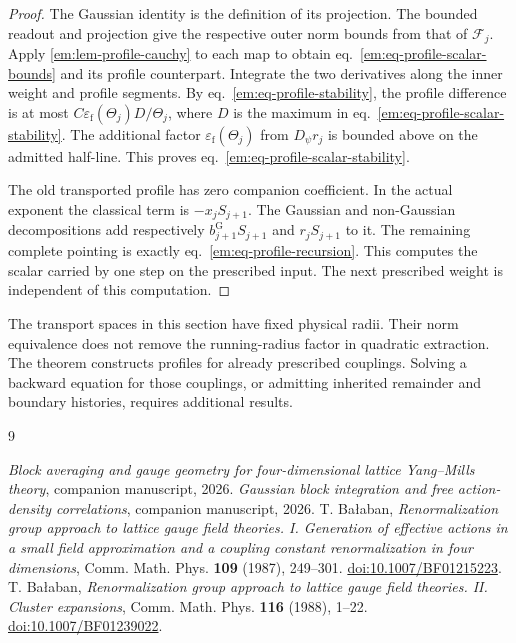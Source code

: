 \documentclass[11pt,letterpaper,reqno]{amsart}
\numberwithin{equation}{section}
\renewcommand{\eqref}[1]{\textup{eq.~\ref{#1}}}
\theoremstyle{definition}
\theoremstyle{remark}
\begin{document}
\begin{proof}
The Gaussian identity is the definition of its projection. The
bounded readout and projection give the respective outer norm
bounds from that of $\mathcal F_j$. Apply
\cref{em:lem-profile-cauchy} to each map to obtain
\eqref{em:eq-profile-scalar-bounds} and its profile counterpart.
Integrate the two derivatives along the inner weight and profile
segments. By \eqref{em:eq-profile-stability}, the profile difference
is at most $C\varepsilon_{\mathrm f}(\Theta_j)D/\Theta_j$, where $D$
is the maximum in \eqref{em:eq-profile-scalar-stability}. The
additional factor $\varepsilon_{\mathrm f}(\Theta_j)$ from $D_\psi r_j$
is bounded above on the admitted half-line. This proves
\eqref{em:eq-profile-scalar-stability}.

The old transported profile has zero companion coefficient. In
the actual exponent the classical term is $-x_j S_{j+1}$.
The Gaussian and non-Gaussian decompositions add respectively
$b^{\mathrm G}_{j+1} S_{j+1}$ and $r_j S_{j+1}$ to it. The remaining complete
pointing is exactly \eqref{em:eq-profile-recursion}. This computes
the scalar carried by one step on the prescribed input. The next
prescribed weight is independent of this computation.
\end{proof}

The transport spaces in this section have fixed physical radii.
Their norm equivalence does not remove the running-radius factor
in quadratic extraction. The theorem constructs profiles for
already prescribed couplings. Solving a backward equation for
those couplings, or admitting inherited remainder and boundary
histories, requires additional results.

\begin{thebibliography}{9}
\raggedright
{} \emph{Block averaging and gauge geometry for four-dimensional lattice Yang--Mills theory}, companion manuscript, 2026.
 \emph{Gaussian block integration and free action-density correlations}, companion manuscript, 2026.
 T. Ba\l aban, \emph{Renormalization group approach to lattice gauge field theories. I. Generation of effective actions in a small field approximation and a coupling constant renormalization in four dimensions}, Comm. Math. Phys. \textbf{109} (1987), 249--301. \href{https://doi.org/10.1007/BF01215223}{doi:10.1007/BF01215223}.
 T. Ba\l aban, \emph{Renormalization group approach to lattice gauge field theories. II. Cluster expansions}, Comm. Math. Phys. \textbf{116} (1988), 1--22. \href{https://doi.org/10.1007/BF01239022}{doi:10.1007/BF01239022}.
\end{thebibliography}
\end{document}
